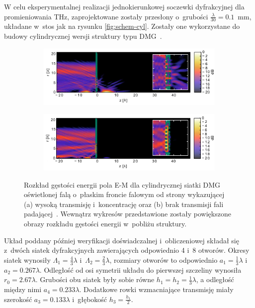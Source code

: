 W celu eksperymentalnej realizacji jednokierunkowej soczewki dyfrakcyjnej dla promieniowania THz, zaprojektowane zostały przesłony o~grubości $\frac{\lambda}{30}=0.1$~mm, układane w~stos jak na rysunku \ref{fig:schem-cyl}. Zostały one wykorzystane do budowy cylindrycznej wersji struktury typu DMG~\cite{Yavorskiy:14}. 
\begin{figure}[tb]
	\begin{subfigure}{\textwidth}
		\includegraphics[width=\textwidth]{images/dmg/express-high-kontrast-trans.png}
		\caption{}
	\end{subfigure}

	\begin{subfigure}{\textwidth}
		\includegraphics[width=\textwidth]{images/dmg/express-high-kontrast-block.png}
		\caption{}
	\end{subfigure}
	\caption{Rozkład gęstości energii pola E-M dla cylindrycznej siatki DMG oświetlonej falą o~płaskim froncie falowym od strony wykazującej (a) wysoką transmisję i~koncentrację oraz (b) brak transmisji fali padającej~\cite{Yavorskiy:14}. Wewnątrz wykresów przedstawione zostały powiększone obrazy rozkładu gęstości energii w~pobliżu struktury.}
	\label{fig:cyl-gest-ene}
\end{figure}

Układ poddany później weryfikacji doświadczalnej i~obliczeniowej składał się z~dwóch siatek dyfrakcyjnych zawierających odpowiednio 4 i~8 otworów. Okresy siatek wynosiły $\Lambda_1=\frac{4}{3} \lambda$ i~$\Lambda_2=\frac{2}{3} \lambda$, rozmiary otworów to odpowiednio $a_1=\frac{1}{3}\lambda$ i~$a_2=0.267 \lambda$. Odległość od osi symetrii układu do pierwszej szczeliny wynosiła $r_0=2.67\lambda$. Grubości obu siatek były sobie równe $h_1=h_2=\frac{1}{3}\lambda$, a odległość między nimi $a_4=0.233\lambda$. Dodatkowe rowki wzmacniające transmisję miały szerokość $a_3=0.133\lambda$ i~głębokość $h_3=\frac{h_1}{2}$. 

